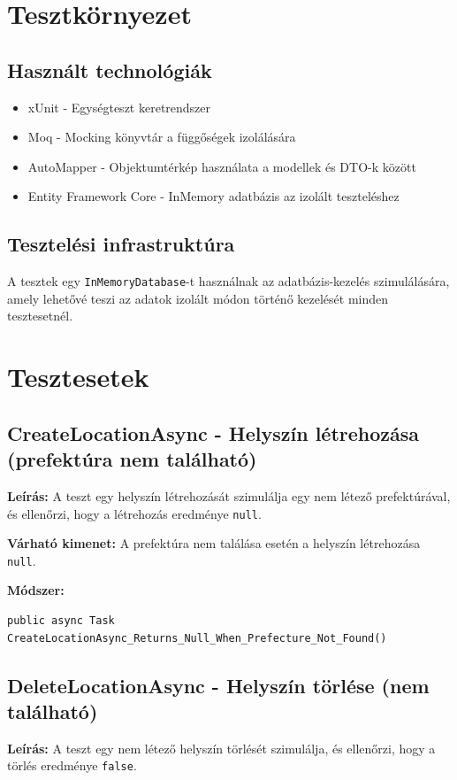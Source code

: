 \documentclass{report}[11pt]
\begin{document}
\section{Tesztkörnyezet}
\subsection{Használt technológiák}
\begin{itemize}
\item xUnit - Egységteszt keretrendszer
\item Moq - Mocking könyvtár a függőségek izolálására
\item AutoMapper - Objektumtérkép használata a modellek és DTO-k között
\item Entity Framework Core - InMemory adatbázis az izolált teszteléshez
\end{itemize}

\subsection{Tesztelési infrastruktúra}
A tesztek egy \texttt{InMemoryDatabase}-t használnak az adatbázis-kezelés szimulálására, amely lehetővé teszi az adatok izolált módon történő kezelését minden tesztesetnél.

\section{Tesztesetek}
\subsection{CreateLocationAsync - Helyszín létrehozása (prefektúra nem található)}
\textbf{Leírás:} A teszt egy helyszín létrehozását szimulálja egy nem létező prefektúrával, és ellenőrzi, hogy a létrehozás eredménye \texttt{null}.

\textbf{Várható kimenet:} A prefektúra nem találása esetén a helyszín létrehozása \texttt{null}.

\textbf{Módszer:} 
\begin{lstlisting}
public async Task CreateLocationAsync_Returns_Null_When_Prefecture_Not_Found()
\end{lstlisting}

\subsection{DeleteLocationAsync - Helyszín törlése (nem található)}
\textbf{Leírás:} A teszt egy nem létező helyszín törlését szimulálja, és ellenőrzi, hogy a törlés eredménye \texttt{false}.
\end{document}
